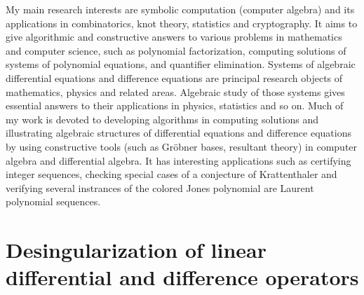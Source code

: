\documentclass[10pt,a4paper]{article}
\begin{document}
My main research interests are symbolic computation (computer algebra) and its applications in combinatorics, knot theory, statistics 
and cryptography.  It aims to give algorithmic and constructive answers 
to various problems in mathematics and computer science, such as polynomial factorization, computing solutions of systems of polynomial equations, 
and quantifier elimination. Systems of algebraic differential equations and difference equations are principal research objects of mathematics, physics and related areas. 
Algebraic study of those systems gives essential answers to their applications in physics, statistics and so on. 
Much of my work is devoted to developing algorithms in  computing solutions and illustrating algebraic structures of differential equations and difference equations
by using constructive tools (such as Gr\"obner bases, resultant theory) in computer algebra and differential algebra. 
It has interesting applications such as certifying integer sequences, checking special cases of a conjecture of Krattenthaler and verifying 
several instrances of the colored Jones polynomial are Laurent polynomial sequences.  

\nopagebreak 
\section*{Desingularization of linear differential and difference operators}

% 
% 
\end{document}
